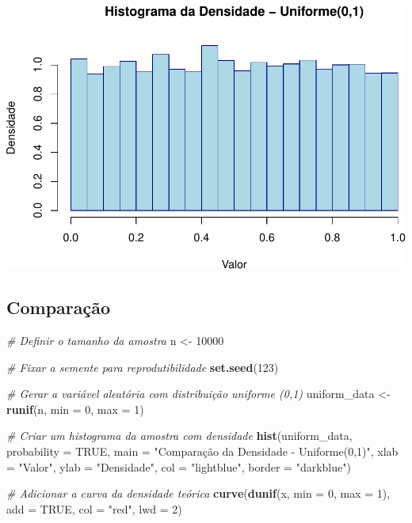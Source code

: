 \documentclass[
]{book}
\newenvironment{Shaded}{\begin{snugshade}}{\end{snugshade}}
\newcommand{\AttributeTok}[1]{\textcolor[rgb]{0.13,0.29,0.53}{#1}}
\newcommand{\CommentTok}[1]{\textcolor[rgb]{0.56,0.35,0.01}{\textit{#1}}}
\newcommand{\ConstantTok}[1]{\textcolor[rgb]{0.56,0.35,0.01}{#1}}
\newcommand{\DecValTok}[1]{\textcolor[rgb]{0.00,0.00,0.81}{#1}}
\newcommand{\FunctionTok}[1]{\textcolor[rgb]{0.13,0.29,0.53}{\textbf{#1}}}
\newcommand{\NormalTok}[1]{#1}
\newcommand{\OtherTok}[1]{\textcolor[rgb]{0.56,0.35,0.01}{#1}}
\newcommand{\StringTok}[1]{\textcolor[rgb]{0.31,0.60,0.02}{#1}}
\begin{document}
\includegraphics{introR_files/figure-latex/unnamed-chunk-270-1.pdf}

\subsection{Comparação}\label{comparauxe7uxe3o-2}

\begin{Shaded}
\begin{Highlighting}[]
\CommentTok{\# Definir o tamanho da amostra}
\NormalTok{n }\OtherTok{\textless{}{-}} \DecValTok{10000}

\CommentTok{\# Fixar a semente para reprodutibilidade}
\FunctionTok{set.seed}\NormalTok{(}\DecValTok{123}\NormalTok{)}

\CommentTok{\# Gerar a variável aleatória com distribuição uniforme (0,1)}
\NormalTok{uniform\_data }\OtherTok{\textless{}{-}} \FunctionTok{runif}\NormalTok{(n, }\AttributeTok{min =} \DecValTok{0}\NormalTok{, }\AttributeTok{max =} \DecValTok{1}\NormalTok{)}

\CommentTok{\# Criar um histograma da amostra com densidade}
\FunctionTok{hist}\NormalTok{(uniform\_data, }\AttributeTok{probability =} \ConstantTok{TRUE}\NormalTok{, }
     \AttributeTok{main =} \StringTok{"Comparação da Densidade {-} Uniforme(0,1)"}\NormalTok{, }
     \AttributeTok{xlab =} \StringTok{"Valor"}\NormalTok{, }
     \AttributeTok{ylab =} \StringTok{"Densidade"}\NormalTok{, }
     \AttributeTok{col =} \StringTok{"lightblue"}\NormalTok{, }
     \AttributeTok{border =} \StringTok{"darkblue"}\NormalTok{)}

\CommentTok{\# Adicionar a curva da densidade teórica}
\FunctionTok{curve}\NormalTok{(}\FunctionTok{dunif}\NormalTok{(x, }\AttributeTok{min =} \DecValTok{0}\NormalTok{, }\AttributeTok{max =} \DecValTok{1}\NormalTok{), }
      \AttributeTok{add =} \ConstantTok{TRUE}\NormalTok{, }
      \AttributeTok{col =} \StringTok{"red"}\NormalTok{, }
      \AttributeTok{lwd =} \DecValTok{2}\NormalTok{)}
\end{Highlighting}
\end{Shaded}
\end{document}

